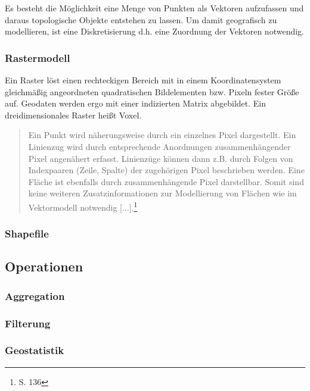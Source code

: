 Es besteht die Möglichkeit eine Menge von Punkten als Vektoren aufzufassen und daraus topologische Objekte entstehen zu lassen.
Um damit geografisch zu modellieren, ist eine Diskretisierung d.h. eine Zuordnung der Vektoren notwendig. 

\subsubsection{Rastermodell}

Ein Raster löst einen rechteckigen Bereich mit in einem Koordinatensystem gleichmäßig angeordneten quadratischen Bildelementen bzw. Pixeln fester Größe auf.
Geodaten werden ergo mit einer indizierten Matrix abgebildet.
Ein dreidimensionales Raster heißt Voxel.
\begin{quote}
Ein Punkt wird näherungsweise durch ein einzelnes Pixel dargestellt. Ein Linienzug wird durch entsprechende Anordnungen zusammenhängender Pixel angenähert erfasst. Linienzüge können dann z.B. durch Folgen von Indexpaaren (Zeile, Spalte) der zugehörigen Pixel beschrieben werden. Eine Fläche ist ebenfalls durch zusammenhängende Pixel darstellbar. Somit sind keine weiteren Zusatzinformationen zur Modellierung von Flächen wie im Vektormodell notwendig [...].\footnote{\cite{book:gi-theopluspraxis3} S. 136}
\end{quote}


\subsubsection{Shapefile}

\subsection{Operationen}

\subsubsection{Aggregation}

\subsubsection{Filterung}

\subsubsection{Geostatistik}

